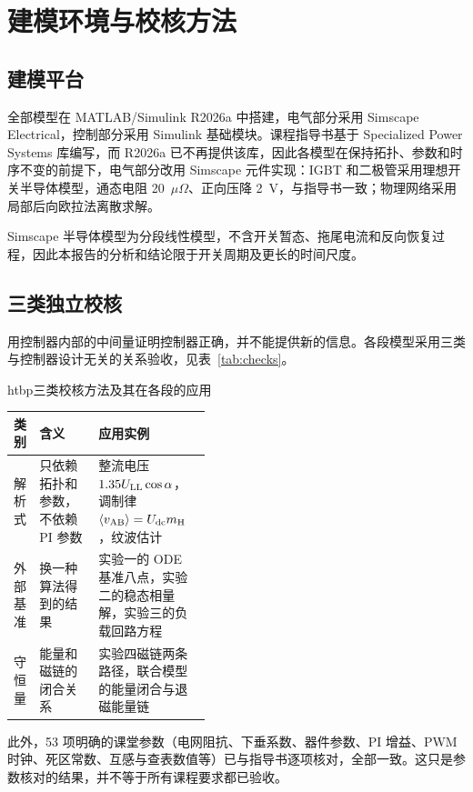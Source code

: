 
\chapter{建模环境与校核方法}
\label{chap:method}

\section{建模平台}

全部模型在 MATLAB/Simulink R2026a 中搭建，电气部分采用 Simscape Electrical，控制部分采用 Simulink 基础模块。课程指导书基于 Specialized Power Systems 库编写，而 R2026a 已不再提供该库，因此各模型在保持拓扑、参数和时序不变的前提下，电气部分改用 Simscape 元件实现：IGBT 和二极管采用理想开关半导体模型，通态电阻 20~$\mu\Omega$、正向压降 2~V，与指导书一致；物理网络采用局部后向欧拉法离散求解。

Simscape 半导体模型为分段线性模型，不含开关暂态、拖尾电流和反向恢复过程，因此本报告的分析和结论限于开关周期及更长的时间尺度。

\section{三类独立校核}

用控制器内部的中间量证明控制器正确，并不能提供新的信息。各段模型采用三类与控制器设计无关的关系验收，见表~\ref{tab:checks}。

\begin{dtable}{htbp}{三类校核方法及其在各段的应用}
\label{tab:checks}
\begin{tabularx}{\linewidth}{P{0.13\linewidth}P{0.3\linewidth}L}
\toprule
\headrow 类别 & 含义 & 应用实例 \\
\midrule
解析式 & 只依赖拓扑和参数，不依赖 PI 参数 & 整流电压 $1.35U_{\mathrm{LL}}\cos\alpha$，调制律 $\langle v_{\mathrm{AB}}\rangle=U_{\mathrm{dc}}m_{\mathrm{H}}$，纹波估计 \\
外部基准 & 换一种算法得到的结果 & 实验一的 ODE 基准八点，实验二的稳态相量解，实验三的负载回路方程 \\
守恒量 & 能量和磁链的闭合关系 & 实验四磁链两条路径，联合模型的能量闭合与退磁能量链 \\
\bottomrule
\end{tabularx}
\end{dtable}

此外，53 项明确的课堂参数（电网阻抗、下垂系数、器件参数、PI 增益、PWM 时钟、死区常数、互感与查表数值等）已与指导书逐项核对，全部一致。这只是参数核对的结果，并不等于所有课程要求都已验收。

